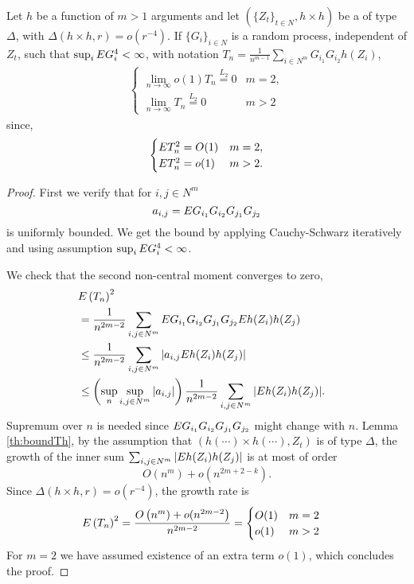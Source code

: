 \begin{lemma}
 \label{lem:higherVstats}
 Let $h$ be a function of  $m>1$ arguments and let $(\{ Z_{t}\}_{t \in N},h \times h)$ be a of type $\varDelta$, with $\varDelta(h \times h,r) = o( r^{-4})$. If  $\{ G_i \}_{i \in N}$  is a random process,  independent of $ Z_{t}$, such that $\sup_{i} E G_i^4 < \infty$, with notation $T_n =\frac {1} {n^{m-1}} \sum_{i \in N^m}   G_{i_1}G_{i_2}   h(Z_i)  $,
\begin{align*}
 \begin{cases}
 \lim_{n \to \infty}  o(1) T_n \overset{L_2}{=} 0 & m=2,  \\
\lim_{n \to \infty} T_n \overset{L_2}{=} 0  & m>2
\end{cases}
\end{align*}
since, 
\begin{align*}
 \begin{cases}
 E T_n^2 = O(1) & m=2,  \\
E T_n^2  = o(1)  & m>2. 
\end{cases}
\end{align*}
\end{lemma}
\begin{proof}
First we verify that for $i,j \in N^m$
\[
 a_{i,j} =  E G_{i_1} G_{i_2}  G_{j_1} G_{j_2}
\]
is uniformly bounded. We get the bound by applying Cauchy-Schwarz iteratively and using assumption   $\sup_{i} E G_i^4 < \infty$. 

We check that the second non-central moment converges to zero,
\begin{align*}
&E  \left( T_n \right)^2 \\
&= \frac {1} {n^{2m-2}}   \sum_{i,j \in N^{m}}    E G_{i_1} G_{i_2} G_{j_1} G_{j_2} E h(Z_i)h(Z_j)   \\
&\leq    \frac {1} {n^{2m-2}} \sum_{i,j \in N^{m}}  |a_{i,j} E h(Z_i)h(Z_j) |  &\\
&\leq \left( \sup_{n} \sup_{i,j \in N^m} |a_{i,j}| \right) \frac {1} {n^{2m-2}} \sum_{i,j \in N^{m}} |E h(Z_i)h(Z_j) |.
\end{align*}
Supremum over $n$ is needed since $E G_{i_1} G_{i_2}  G_{j_1} G_{j_2}$ might change with $n$. Lemma \ref{th:boundTh}, by the assumption that  $(h(\cdots ) \times h(\cdots ),Z_t )$ is of type $\varDelta$, the growth of the inner sum 
$
 \sum_{i,j \in N^{m}} |E h(Z_i)h(Z_j) |
$
is at most of order 
\[
O(n^m) +o(n^{2 m +2-k}). 
\]
Since $\varDelta(h \times h,r) =o( r^{-4})$, the growth rate is 
\begin{align*}
 E &\left( T_n \right)^2= \frac{O\left(n^m) +o(n^{2m-2}\right) }{ n^{2m-2}} =\begin{cases}
O(1)   & m=2\\
o(1) & m >2
\end{cases}
\end{align*}
For $m=2$ we have assumed existence of an  extra term $o(1)$,  which concludes the proof.
\end{proof}

